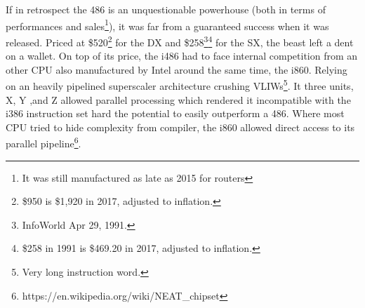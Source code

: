If in retrospect the 486 is an unquestionable powerhouse (both in terms of performances and sales\footnote{It was still manufactured as late as 2015 for routers}), it was far from a guaranteed success when it was released. Priced at \$520\footnote{\$950 is \$1,920 in 2017, adjusted to inflation.} for the DX 
and \$258\footnote{InfoWorld Apr 29, 1991.}\footnote{\$258 in 1991 is \$469.20 in 2017, adjusted to inflation.} for the SX, the beast left a dent on a wallet. 
On top of its price, the i486 had to face internal competition from an other CPU also manufactured by Intel around the same time, the i860. Relying on an heavily pipelined superscaler architecture crushing VLIWs\footnote{Very long instruction word.}. It three units, X, Y ,and Z allowed parallel processing which rendered it incompatible with the i386 instruction set hard the potential to easily outperform a 486. Where most CPU tried to hide complexity from compiler, the i860 allowed direct access to its parallel pipeline\footnote{https://en.wikipedia.org/wiki/NEAT\_chipset}.\\
\par
